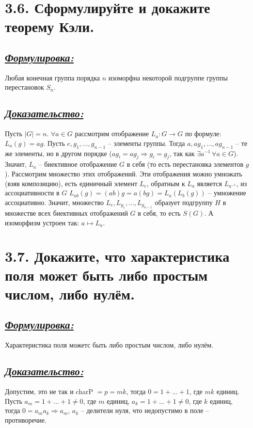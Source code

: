\documentclass{article}
\begin{document}
\section*{\LARGE 3.6. Сформулируйте и докажите теорему Кэли. }
\subsection*{\Large \underline{\textit{Формулировка: }}}
Любая конечная группа порядка $n$ изоморфна некоторой подгруппе группы перестановок $S_n$.

\subsection*{\Large \underline{\textit{Доказательство: }}}
Пусть $|G| = n$. $\forall a \in G$ рассмотрим отображение $L_a : G \rightarrow G$ по формуле: $L_a(g) = ag$.
\newline Пусть $e, g_1, ..., g_{n-1}$ -- элементы группы. Тогда $a, ag_1, ..., ag_{n - 1}$ -- те же элементы, но в другом порядке ($ag_i = ag_j \Rightarrow g_i = g_j$, так как $\exists a^{-1}\,\forall a \in G$). Значит, $L_a$ -- биективное отображение $G$ в себя (то есть перестановка элементов $g$). Рассмотрим множество этих отображений. Эти отображения можно умножать (взяв композицию), есть единичный элемент $L_e$, обратным к $L_a$ является $L_{a^{-1}}$, из ассоциативности в $G$ $L_{ab}(g) = (ab)g = a(bg) = L_a(L_b(g))$ -- умножение ассоциативно. Значит, множество $L_e, L_{g_1}, ..., L_{g_{n-1}}$ образует подгруппу $H$ в множестве всех биективных отображений $G$ в себя, то есть $S(G)$. А изоморфизм устроен так: $a \mapsto L_a$.

\section*{\LARGE 3.7. Докажите, что характеристика поля может быть либо простым числом, либо нулём. }
\subsection*{\Large \underline{\textit{Формулировка: }}}
Характеристика поля можетс быть либо простым числом, либо нулём.

\subsection*{\Large \underline{\textit{Доказательство: }}}
Допустим, это не так и charP $ = p = m k$, тогда $0 = 1 + ... + 1$, где $mk$ единиц. Пусть $a_m = 1 + ... + 1 \ne 0$, где $m$ единиц, $a_k = 1 + ... + 1 \ne 0$, где $k$ единиц, тогда $0 = a_m a_k \Rightarrow a_m,\, a_k$ -- делители нуля, что недопустимо в поле -- противоречие.
\end{document}
